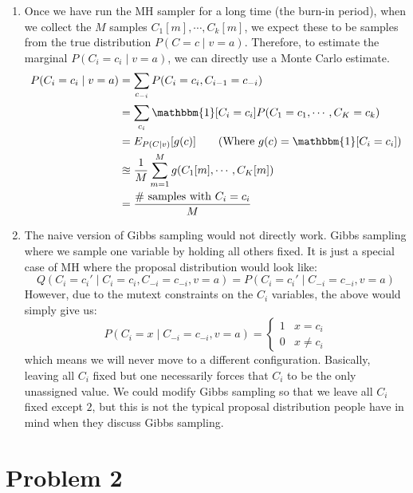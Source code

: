 \documentclass[12pt]{article}
\begin{document}
\begin{enumerate}[label=(\alph*)]
  \item Once we have run the MH sampler for a long time (the burn-in period), when we collect the $M$ samples $C_1[m], \cdots, C_k[m]$, we expect these to be samples from the true distribution $P(C = c \mid v = a)$. Therefore, to estimate the marginal $P(C_i = c_i \mid v = a)$, we can directly use a Monte Carlo estimate.
  \begin{align*}
  	P(C_i = c_i \mid v = a) &= \sum_{c_{-i}} P(C_i = c_i, C_{i-1} = c_{-i}) \\
  	&= \sum_{c_i} \mathbbm{1}[C_i = c_i]P(C_1 = c_1, \cdots, C_K = c_k) \\
  	&= E_{P(C \mid v)}[g(c)] \tag{Where $g(c) = \mathbbm{1}[C_i = c_i]$}\\
  	&\approxeq \frac{1}{M} \sum_{m = 1}^M g(C_1[m], \cdots, C_K[m]) \\
  	&= \frac{\#\text{ samples with }C_i = c_i}{M}
  \end{align*}
  \item The naive version of Gibbs sampling would not directly work. Gibbs sampling where we sample one variable by holding all others fixed. It is just a special case of MH where the proposal distribution would look like: 
  $$
  	Q(C_i = c_i' \mid C_{i} = c_i, C_{-i} = c_{-i}, v= a) = P(C_i = c_i' \mid C_{-i} = c_{-i} ,v=a)
  $$
  However, due to the mutext constraints on the $C_i$ variables, the above would simply give us:
  $$
  P(C_i = x \mid C_{-i} = c_{-i} ,v=a) = \begin{cases} 
      1 & x = c_i \\
      0 & x \neq c_i 
   \end{cases}
	$$
	which means we will never move to a different configuration. Basically, leaving all $C_i$ fixed but one necessarily forces that $C_i$ to be the only unassigned value. We could modify Gibbs sampling so that we leave all $C_i$ fixed except $2$, but this is not the typical proposal distribution people have in mind when they discuss Gibbs sampling.
\end{enumerate}

\section*{Problem 2}
\end{document}
